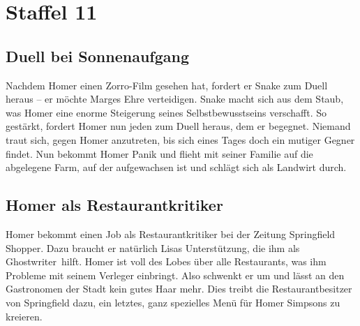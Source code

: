 

\section{Staffel 11}
 	
\subsection{Duell bei Sonnenaufgang}\label{AABF19}
Nachdem Homer einen \glqq Zorro\grqq -Film gesehen hat, fordert er Snake zum Duell heraus -- er möchte Marges Ehre verteidigen. Snake macht sich aus dem Staub, was Homer eine enorme Steigerung seines Selbstbewusstseins verschafft. So gestärkt, fordert Homer nun jeden zum Duell heraus, dem er begegnet. Niemand traut sich, gegen Homer anzutreten, bis sich eines Tages doch ein mutiger Gegner findet. Nun bekommt Homer Panik und flieht mit seiner Familie auf die abgelegene Farm, auf der aufgewachsen ist und schlägt sich als Landwirt durch.


	
\subsection{Homer als Restaurantkritiker}\label{AABF21}
Homer bekommt einen Job als Restaurantkritiker bei der Zeitung \glqq Springfield Shopper\grqq . Dazu braucht er natürlich Lisas Unterstützung, die ihm als \glqq Ghostwriter\grqq\ hilft. Homer ist voll des Lobes über alle Restaurants, was ihm Probleme mit seinem Verleger einbringt. Also schwenkt er um und lässt an den Gastronomen der Stadt kein gutes Haar mehr. Dies treibt die Restaurantbesitzer von Springfield dazu, ein letztes, ganz spezielles Menü für Homer Simpsons zu kreieren.

